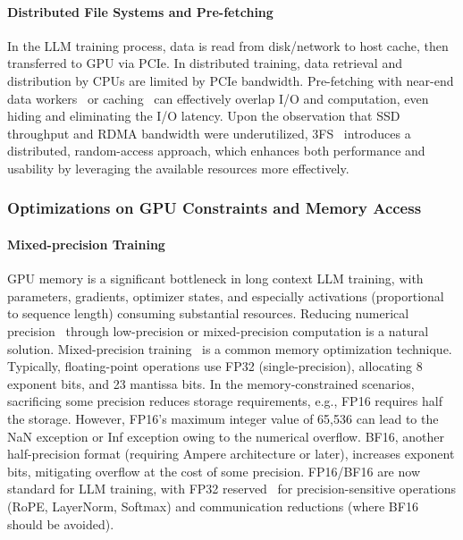 \documentclass[11pt, a4paper, logo, copyright, nonumbering]{map}
\begin{document}
\paragraph{Distributed File Systems and Pre-fetching} In the LLM training process, data is read from disk/network to host cache, then transferred to GPU via PCIe.
In distributed training, data retrieval and distribution by CPUs are limited by PCIe bandwidth.
Pre-fetching with near-end data workers~\cite{zhao2023goldminer} or caching~\cite{dong2020eflops} can effectively overlap I/O and computation, even hiding and eliminating the I/O latency.
Upon the observation that SSD throughput and RDMA bandwidth were underutilized, 3FS~\cite{deepseek3fs} introduces a distributed, random-access approach, which enhances both performance and usability by leveraging the available resources more effectively.

\subsubsection{Optimizations on GPU Constraints and Memory Access}

\paragraph{Mixed-precision Training}
GPU memory is a significant bottleneck in long context LLM training, with parameters, gradients, optimizer states, and especially activations (proportional to sequence length) consuming substantial resources.
Reducing numerical precision~\cite{guan2024aptq} through low-precision or mixed-precision computation is a natural solution.
Mixed-precision training~\cite{micikevicius2017mixed} is a common memory optimization technique.
Typically, floating-point operations use FP32 (single-precision), allocating 8 exponent bits, and 23 mantissa bits.
In the memory-constrained scenarios, sacrificing some precision reduces storage requirements, e.g., FP16 requires half the storage.
However, FP16's maximum integer value of 65,536 can lead to the NaN exception or Inf exception owing to the numerical overflow. 
BF16, another half-precision format (requiring Ampere architecture or later), increases exponent bits, mitigating overflow at the cost of some precision.
FP16/BF16 are now standard for LLM training, with FP32 reserved~\cite{wang2024precision} for precision-sensitive operations (RoPE, LayerNorm, Softmax) and communication reductions (where BF16 should be avoided).
\end{document}
